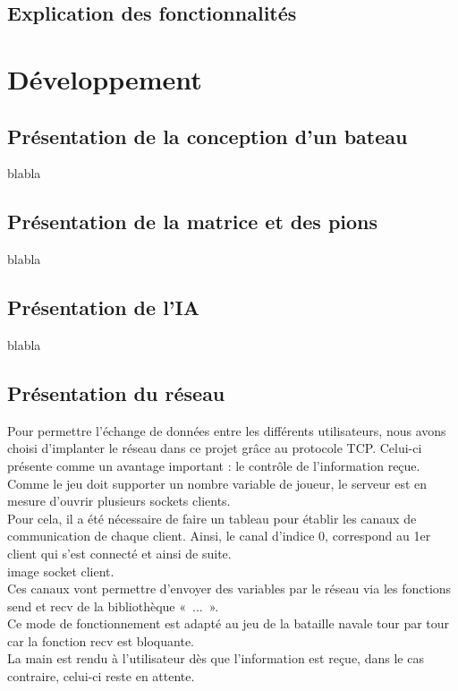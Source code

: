 \documentclass[a4paper,12pt]{article}
\begin{document}
\subsection {Explication des fonctionnalités}

\newpage
\section {Développement}
\subsection {Présentation de la conception d'un bateau}
blabla
\newpage
\subsection {Présentation de la matrice et des pions}
blabla
\newpage
\subsection {Présentation de l'IA}
blabla
\newpage
\subsection {Présentation du réseau}
Pour permettre l’échange de données entre les différents utilisateurs, nous avons choisi d’implanter le réseau dans ce projet grâce au protocole TCP. Celui-ci présente comme un avantage important : le contrôle de l’information reçue.
\\ Comme le jeu doit supporter un nombre variable de joueur, le serveur est en mesure d’ouvrir plusieurs sockets clients.
\\ Pour cela, il a été nécessaire de faire un tableau pour établir les canaux de communication de chaque client. Ainsi, le canal d’indice 0, correspond au 1er client qui s’est connecté et ainsi de suite.
\\image socket client.
\\ Ces canaux vont permettre d’envoyer des variables par le réseau via les fonctions send et recv de la bibliothèque « ... ».
\\ Ce mode de fonctionnement est adapté au jeu de la bataille navale tour par tour car la fonction recv est bloquante. 
\\ La main est rendu à l’utilisateur dès que l’information est reçue, dans le cas contraire, celui-ci reste en attente.

\newpage

\newpage
\end{document}
